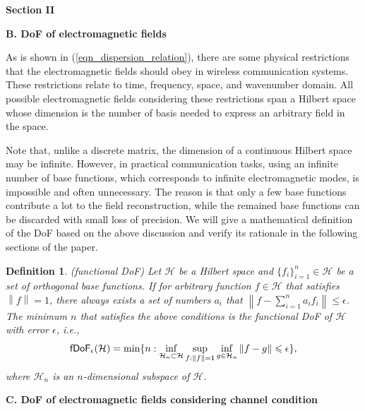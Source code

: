 \documentclass[a4paper,12pt]{article}
\newtheorem{definition}{Definition}
\begin{document}
\begin{framed}
	{\bf Section II}

    {\color{red}
    	{\bf{B. DoF of electromagnetic fields}}
    	
    	\quad As is shown in (\ref{eqn_dispersion_relation}), there are some physical restrictions that the electromagnetic fields should obey in wireless communication systems. These restrictions relate to time, frequency, space, and wavenumber domain. All possible electromagnetic fields considering these restrictions span a Hilbert space whose dimension is the number of basis needed to express an arbitrary field in the space. 
    	
    	\quad Note that, unlike a discrete matrix, the dimension of a continuous Hilbert space may be infinite. However, in practical communication tasks, using an infinite number of base functions, which corresponds to infinite electromagnetic modes, is impossible and often unnecessary. The reason is that only a few base functions contribute a lot to the field reconstruction, while the remained base functions can be discarded with small loss of precision. We will give a mathematical definition of the DoF based on the above discussion and verify its rationale in the following sections of the paper. 
    }
    
    \begin{definition}
    	\label{def_fDoF}
    	(functional DoF) Let $\mathcal{H}$ be a Hilbert space and $\{f_i\}_{i=1}^n \in \mathcal{H}$ be a set of orthogonal base functions. If for arbitrary function $f \in \mathcal{H}$ that satisfies $\left\| f \right\|=1$, there always exists a set of numbers $a_i$ that 
    	$\left\| f-\sum_{i=1}^n a_i f_i  \right\| \leqslant \epsilon$. The minimum $n$ that satisfies the above conditions is the functional DoF of $\mathcal{H}$ with error $\epsilon$, i.e.,
    	\begin{equation}
    		\mathsf{fDoF}_{\epsilon} (\mathcal{H}) = {\rm min}\{ n: \underset{\mathcal{H}_n \subset \mathcal{H}}{\rm inf} \sup_{f: \left\| f \right\|=1} \inf_{g \in \mathcal{H}_n} \left\| f-g \right\| \leqslant \epsilon  \},
    	\end{equation}
    	where $\mathcal{H}_n$ is an $n$-dimensional subspace of $\mathcal{H}$.
    \end{definition}
    
    {\color{red}
    	{\bf{C. DoF of electromagnetic fields considering channel condition}}
    	
}
\end{framed}
\end{document}
